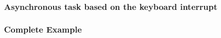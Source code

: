 \begin{frame}[fragile]
    \frametitle{Asynchronous task based on the keyboard interrupt}
% 
% 
% 
% 
% 
% 
% 
\end{frame}
\begin{frame}[fragile]
    \frametitle{Complete Example}
% 
% 
\end{frame}

